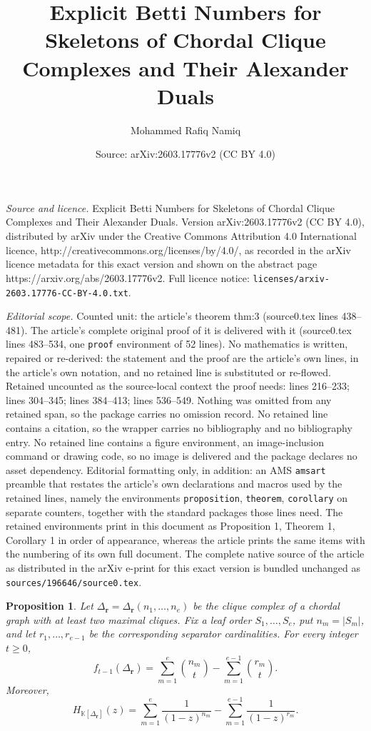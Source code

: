 \documentclass[10pt,a4paper]{amsart}
\title{Explicit Betti Numbers for Skeletons of Chordal Clique Complexes and Their Alexander Duals}
\author{Mohammed Rafiq Namiq}
\date{Source: arXiv:2603.17776v2 (CC BY 4.0)}
\newtheorem{proposition}{Proposition}
\newcommand{\K}{\mathbb K}
\newcommand{\SR}[1]{\K[#1]}
\begin{document}
\maketitle

\noindent\emph{Source and licence.} Explicit Betti Numbers for Skeletons of Chordal Clique Complexes and Their Alexander Duals. Version arXiv:2603.17776v2 (CC BY 4.0), distributed by arXiv under the Creative Commons Attribution 4.0 International licence, http://creativecommons.org/licenses/by/4.0/, as recorded in the arXiv licence metadata for this exact version and shown on the abstract page https://arxiv.org/abs/2603.17776v2. Full licence notice: \texttt{licenses/arxiv-2603.17776-CC-BY-4.0.txt}.\par\smallskip

\noindent\textit{Editorial scope.} Counted unit: the article's theorem thm:3 (source0.tex lines 438--481). The article's complete original proof of it is delivered with it (source0.tex lines 483--534, one \texttt{proof} environment of 52 lines). No mathematics is written, repaired or re-derived: the statement and the proof are the article's own lines, in the article's own notation, and no retained line is substituted or re-flowed.  Retained uncounted as the source-local context the proof needs: lines 216--233; lines 304--345; lines 384--413; lines 536--549.  Nothing was omitted from any retained span, so the package carries no omission record.  No retained line contains a citation, so the wrapper carries no bibliography and no bibliography entry.  No retained line contains a figure environment, an image-inclusion command or drawing code, so no image is delivered and the package declares no asset dependency.  Editorial formatting only, in addition: an AMS \texttt{amsart} preamble that restates the article's own declarations and macros used by the retained lines, namely the environments \texttt{proposition}, \texttt{theorem}, \texttt{corollary} on separate counters, together with the standard packages those lines need.  The retained environments print in this document as Proposition 1, Theorem 1, Corollary 1 in order of appearance, whereas the article prints the same items with the numbering of its own full document.  The complete native source of the article as distributed in the arXiv e-print for this exact version is bundled unchanged as \texttt{sources/196646/source0.tex}.
	\begin{proposition}\label{prop:2}
		Let $\Delta_{\mathbf r}=\Delta_{\mathbf r}(n_1,\ldots,n_e)$ be the clique complex of a chordal graph with at least two maximal cliques. Fix a leaf order $S_1,\ldots,S_e$, put $n_m=|S_m|$, and let $r_1,\ldots,r_{e-1}$ be the corresponding separator cardinalities. For every integer $t\ge0$,
		\[
		f_{t-1}(\Delta_{\mathbf r})
		=
		\sum_{m=1}^e\binom{n_m}{t}
		-
		\sum_{m=1}^{e-1}\binom{r_m}{t}.
		\]
		Moreover,
		\[
		H_{\SR{\Delta_{\mathbf r}}}(z)
		=
		\sum_{m=1}^e\frac{1}{(1-z)^{n_m}}
		-
		\sum_{m=1}^{e-1}\frac{1}{(1-z)^{r_m}}.
		\]
	\end{proposition}
\end{document}
